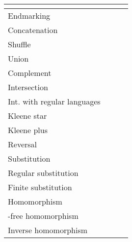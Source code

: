 \documentclass{ws-ijmpc}
\providecommand{\tabularnewline}{\\}
\begin{document}
\begin{center}
\begin{tabular}{|l|>{\raggedleft}p{10mm}>{\centering}p{3mm}|>{\centering}p{17mm}|}
\cline{2-4} 
\multicolumn{1}{l|}{} & \multicolumn{2}{c|}{} & \tabularnewline
\hline 
Endmarking &  &  & \tabularnewline
\hline 
Concatenation &  &  & \tabularnewline
\hline 
Shuffle &  &  & \tabularnewline
\hline 
Union &  &  & \tabularnewline
\hline 
Complement &  &  & \tabularnewline
\hline 
Intersection &  &  & \tabularnewline
\hline 
Int. with regular languages &  &  & \tabularnewline
\hline 
Kleene star &  &  & \tabularnewline
\hline 
Kleene plus &  &  & \tabularnewline
\hline 
Reversal &  &  & \tabularnewline
\hline 
Substitution &  &  & \tabularnewline
\hline 
Regular substitution &  &  & \tabularnewline
\hline 
Finite substitution &  &  & \tabularnewline
\hline 
Homomorphism &  &  & \tabularnewline
\hline 
-free homomorphism &  &  & \tabularnewline
\hline 
Inverse homomorphism &  &  & \tabularnewline
\hline 
\end{tabular}\medskip{}

\par\end{center}
\end{document}
